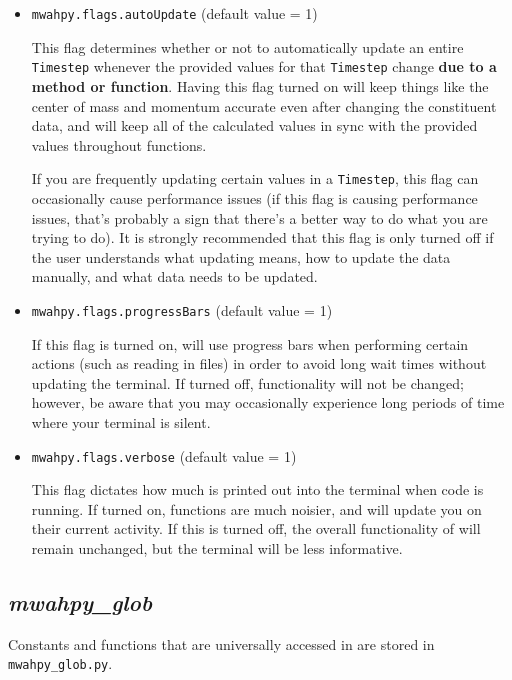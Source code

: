 \documentclass{article}
\begin{document}
\begin{itemize}

\item \verb!mwahpy.flags.autoUpdate! (default value = 1)

This flag determines whether or not to automatically update an entire \verb!Timestep! whenever the provided values for that \verb!Timestep! change \textbf{due to a \mwahpy method or function}. Having this flag turned on will keep things like the center of mass and momentum accurate even after changing the constituent data, and will keep all of the calculated values in sync with the provided values throughout \mwahpy functions. 

If you are frequently updating certain values in a \verb!Timestep!, this flag can occasionally cause performance issues (if this flag is causing performance issues, that's probably a sign that there's a better way to do what you are trying to do). It is strongly recommended that this flag is only turned off if the user understands what updating means, how to update the data manually, and what data needs to be updated. 

\item \verb!mwahpy.flags.progressBars! (default value = 1)

If this flag is turned on, \mwahpy will use progress bars when performing certain actions (such as reading in files) in order to avoid long wait times without updating the terminal. If turned off, \mwahpy functionality will not be changed; however, be aware that you may occasionally experience long periods of time where your terminal is silent.

\item \verb!mwahpy.flags.verbose! (default value = 1)

This flag dictates how much is printed out into the terminal when \mwahpy code is running. If turned on, functions are much noisier, and will update you on their current activity. If this is turned off, the overall functionality of \mwahpy will remain unchanged, but the terminal will be less informative. 

\end{itemize}

\subsection{\textit{mwahpy\_glob}}

Constants and functions that are universally accessed in \mwahpy are stored in \verb!mwahpy_glob.py!. 
\end{document}
